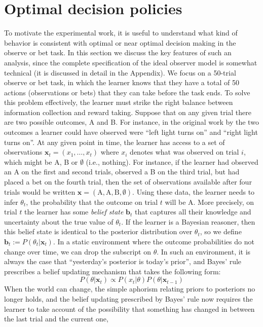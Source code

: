 \documentclass[authoryear]{elsarticle}
\newcommand{\sectionX}[1]{\section{#1}}
\begin{document}
\sectionX{Optimal decision policies}

To motivate the experimental work, it is useful to understand what kind of behavior is consistent with optimal or near optimal decision making in the observe or bet task. In this section we discuss the key features of such an analysis, since the complete specification of the ideal observer model is somewhat technical (it is discussed in detail in the Appendix). We focus on a 50-trial observe or bet task, in which the learner knows that they have a total of 50 actions (observations or bets) that they can take before the task ends. To solve this problem effectively, the learner must strike the right balance between information collection and reward taking. Suppose that on any given trial there are two possible outcomes, A and B. For instance, in the original work by \citep{tversky_information_1966} the two outcomes a learner could have observed were ``left light turns on'' and ``right light turns on''. At any given point in time, the learner has access to a set of observations $\bm{x}_t=(x_1,\ldots,x_t)$ where $x_i$ denotes what was observed on trial $i$, which might be A, B or $\emptyset$ (i.e., nothing). For instance, if the learner had observed an A on the first and second trials, observed a B on the third trial, but had placed a bet on the fourth trial, then the set of observations available after four trials would be written $\bm{x} = (\mbox{A},\mbox{A},\mbox{B},\emptyset)$. Using these data, the learner needs to infer $\theta_t$, the probability that the outcome on trial $t$ will be A. More precisely, on trial $t$ the learner has some {\it belief state} $\bm{b}_t$ that captures all their knowledge and uncertainty about the true value of $\theta_t$. If the learner is a Bayesian reasoner, then this belief state is identical to the posterior distribution over $\theta_t$, so we define $\bm{b}_t := P(\theta_t | \bm{x}_t)$. In a static environment where the outcome probabilities do not change over time, we can drop the subscript on $\theta$. In such an environment, it is always the case that ``yesterday's posterior is today's prior'', and Bayes' rule prescribes a belief updating mechanism that takes the following form:
\begin{equation}
P( \theta | \bm{x}_t ) \propto P(x_t | \theta) P(\theta | \bm{x}_{t-1})
\end{equation}
When the world can change, the simple aphorism relating priors to posteriors no longer holds, and the belief updating prescribed by Bayes' rule now requires the learner to take account of the possibility that something has changed in between the last trial and the current one,
\end{document}
